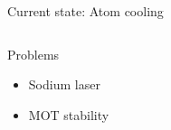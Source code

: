\documentclass{beamer}
\begin{document}
\begin{frame}{Current state: Atom cooling}
\begin{columns}[t]
\begin{center}
{
      }
       {
        \begin{block}{Problems}
          \begin{itemize}
          \item<9-> Sodium laser
          \item<10-> MOT stability
          \end{itemize}
        \end{block}
      }
    \end{center}
  \end{columns}
\end{frame}




\end{document}
